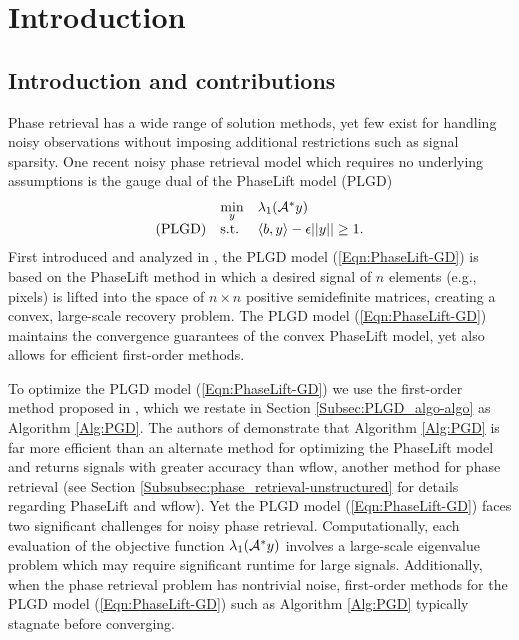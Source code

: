 
\chapter{Introduction}  \label{Sec:Intro}			\label{Sec:intro}



\section{Introduction and contributions} 		\label{Subsec:intro-contributions}

Phase retrieval has a wide range of solution methods, yet few exist for handling noisy observations without imposing additional restrictions such as signal sparsity.  One recent noisy phase retrieval model which requires no underlying assumptions is the gauge dual of the PhaseLift model (PLGD)
\begin{equation} \label{Eqn:PhaseLift-GD}
\begin{array}{lll}
	&	\min\limits_{\substack{y}}
		&	\lambda_1({\mathcal A}^* y)
		\\
\textnormal{(PLGD)}
	&	\textnormal{s.t.}
		&	\langle b, y \rangle - \epsilon ||y|| \geq 1.
\end{array}
\end{equation}
First introduced and analyzed in \cite{DBLP:journals/siamsc/FriedlanderM16}, the PLGD model (\ref{Eqn:PhaseLift-GD}) is based on the PhaseLift method \cite{DBLP:journals/siamis/CandesESV13} in which a desired signal of $n$ elements (e.g., pixels) is lifted into the space of $n \times n$ positive semidefinite matrices, creating a convex, large-scale recovery problem.  
The PLGD model (\ref{Eqn:PhaseLift-GD}) maintains the convergence guarantees of the convex PhaseLift model, yet also allows for efficient first-order methods.


To optimize the PLGD model (\ref{Eqn:PhaseLift-GD}) we use the first-order method proposed in \cite[Section 4.4]{DBLP:journals/siamsc/FriedlanderM16}, which we restate in Section \ref{Subsec:PLGD_algo-algo} as Algorithm \ref{Alg:PGD}.
The authors of \cite{DBLP:journals/siamsc/FriedlanderM16} demonstrate that Algorithm \ref{Alg:PGD} is far more efficient than an alternate method for optimizing the PhaseLift model and returns signals with greater accuracy than wflow, another method for phase retrieval (see Section \ref{Subsubsec:phase_retrieval-unstructured} for details regarding PhaseLift and wflow).  Yet the PLGD model (\ref{Eqn:PhaseLift-GD}) faces two significant challenges for noisy phase retrieval.  Computationally, each evaluation of the objective function $\lambda_1({\mathcal A}^*y)$ involves a large-scale eigenvalue problem which may require significant runtime for large signals.  Additionally, when the phase retrieval problem has nontrivial noise, first-order methods for the PLGD model (\ref{Eqn:PhaseLift-GD}) such as Algorithm \ref{Alg:PGD} typically stagnate before converging.


